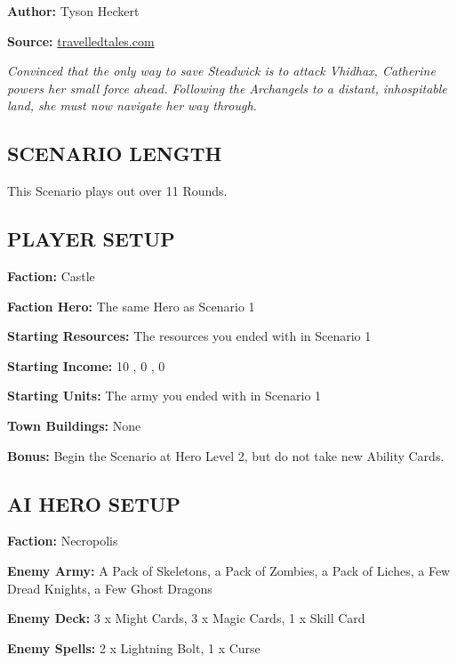 
\begin{multicols*}{2}

\textbf{Author:} Tyson Heckert

\textbf{Source:} \href{https://travelledtales.com}{travelledtales.com}

\textit{Convinced that the only way to save Steadwick is to attack Vhidhax, Catherine powers her small force ahead.
Following the Archangels to a distant, inhospitable land, she must now navigate her way through.}

\subsection*{\MakeUppercase{Scenario length}}

This Scenario plays out over 11 Rounds.

\subsection*{\MakeUppercase{Player setup}}

\textbf{Faction:} Castle

\textbf{Faction Hero:} The same Hero as Scenario 1

\textbf{Starting Resources:} The resources you ended with in Scenario 1

\textbf{Starting Income:} 10 , 0 , 0 

\textbf{Starting Units:} The army you ended with in Scenario 1

\textbf{Town Buildings:} None

\textbf{Bonus:} Begin the Scenario at Hero Level 2, but do not take new Ability Cards.

\subsection*{\MakeUppercase{AI Hero setup}}

\textbf{Faction:} Necropolis

\textbf{Enemy Army:} A Pack of Skeletons, a Pack of Zombies, a Pack of Liches, a Few Dread Knights, a Few Ghost Dragons

\textbf{Enemy Deck:} 3 x Might Cards, 3 x Magic Cards, 1 x Skill Card

\textbf{Enemy Spells:} 2 x Lightning Bolt, 1 x Curse


\end{multicols*}
